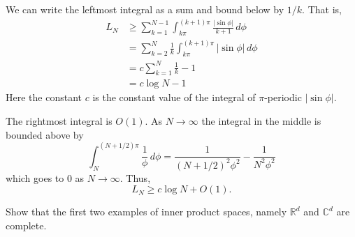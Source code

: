 \documentclass[12 pt, letterpaper]{hmcpset}
\begin{document}
\begin{solution}
\begin{enumerate}
			We can write the leftmost integral as a sum and bound below by $1 / k$. That is,
			\begin{align*}
				L_{N} & \ge \sum_{k = 1}^{N - 1} \int_{k \pi}^{(k + 1) \pi} \frac{\lvert \sin{\phi} \rvert}{k + 1} \, d\phi \\
				      & = \sum_{k = 2}^{N} \frac{1}{k} \int_{k \pi}^{(k + 1) \pi} \lvert \sin{\phi} \rvert  \, d \phi \\
				      & = c \sum_{k = 1}^{N} \frac{1}{k} - 1 \\
				      & = c \log N - 1
			\end{align*}
			Here the constant $c$ is the constant value of the integral of $\pi$-periodic $\lvert \sin{\phi} \rvert$.

			The rightmost integral is $O(1)$. As $N \to \infty$ the integral in the middle is bounded above by
			\[
				\int_{N}^{(N + 1/2) \pi} \frac{1}{\phi} \, d\phi = \frac{1}{(N + 1 /2)^{2} \phi^{2}} - \frac{1}{N^{2} \phi^{2}}
			\]
			which goes to $0$ as $N \to \infty$. Thus,
			\[
				L_{N} \ge c \log N + O(1).
			\]
	\end{enumerate}
\end{solution}

\pagebreak

\begin{problem}[S \& S \S 3.3 \#1.]
	Show that the first two examples of inner product spaces, namely $\mathbb{R}^{d}$ and $\mathbb{C}^{d}$ are complete.
\end{problem}
\end{document}
